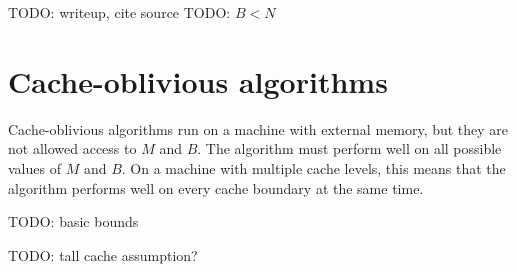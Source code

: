 TODO: writeup, cite source
TODO: $B<N$

\section{Cache-oblivious algorithms}
Cache-oblivious algorithms run on a machine with external memory, but they are
not allowed access to $M$ and $B$. The algorithm must perform well on all
possible values of $M$ and $B$.
On a machine with multiple cache levels, this means that the algorithm performs
well on every cache boundary at the same time.

TODO: basic bounds

TODO: tall cache assumption?
